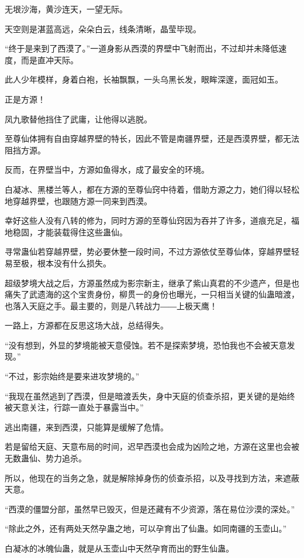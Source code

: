 
\begin{this_body}

无垠沙海，黄沙连天，一望无际。

天空则是湛蓝高远，朵朵白云，线条清晰，晶莹毕现。

“终于是来到了西漠了。”一道身影从西漠的界壁中飞射而出，不过却并未降低速度，而是直冲天际。

此人少年模样，身着白袍，长袖飘飘，一头乌黑长发，眼眸深邃，面冠如玉。

正是方源！

凤九歌替他挡住了武庸，让他得以逃脱。

至尊仙体拥有自由穿越界壁的特长，因此不管是南疆界壁，还是西漠界壁，都无法阻挡方源。

反而，在界壁当中，方源如鱼得水，成了最安全的环境。

白凝冰、黑楼兰等人，都在方源的至尊仙窍中待着，借助方源之力，她们得以轻松地穿越界壁，也跟随方源一同来到西漠。

幸好这些人没有八转的修为，同时方源的至尊仙窍因为吞并了许多，道痕充足，福地稳固，才能装载得住这些蛊仙。

寻常蛊仙若穿越界壁，势必要休整一段时间，不过方源依仗至尊仙体，穿越界壁轻易至极，根本没有什么损失。

超级梦境大战之后，方源虽然成为影宗新主，继承了紫山真君的不少遗产，但是也痛失了武遗海的这个宝贵身份，柳贯一的身份也曝光，一只相当关键的仙蛊暗渡，也落入天庭之手。最主要的，则是八转战力――上极天鹰！

一路上，方源都在反思这场大战，总结得失。

“没有想到，外显的梦境能被天意侵蚀。若不是探索梦境，恐怕我也不会被天意发现。”

“不过，影宗始终是要来进攻梦境的。”

“我现在虽然逃到了西漠，但是暗渡丢失，身中天庭的侦查杀招，更关键的是始终被天意关注，行踪一直处于暴露当中。”

逃出南疆，来到西漠，只能算是缓解了危情。

若是留给天庭、天意布局的时间，迟早西漠也会成为凶险之地，方源在这里也会被无数蛊仙、势力追杀。

所以，他现在的当务之急，就是解除掉身伤的侦查杀招，以及寻找到方法，来遮蔽天意。

“西漠的僵盟分部，虽然早已毁灭，但是还藏有不少资源，落在易位沙漠的深处。”

“除此之外，还有两处天然孕蛊之地，可以孕育出了仙蛊。如同南疆的玉壶山。”

白凝冰的冰魄仙蛊，就是从玉壶山中天然孕育而出的野生仙蛊。


\end{this_body}
